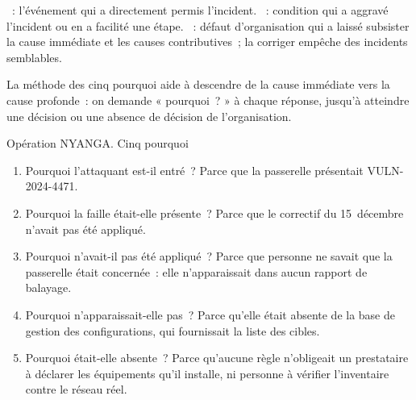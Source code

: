 \begin{boxdef}
\textbf{}~: l'événement qui a directement permis
l'incident. \textbf{}~: condition qui a
aggravé l'incident ou en a facilité une étape. \textbf{}~: défaut d'organisation qui a laissé subsister la cause
immédiate et les causes contributives~; la corriger empêche des incidents
semblables.
\end{boxdef}

La méthode des cinq pourquoi aide à descendre de la cause immédiate vers la
cause profonde~: on demande « pourquoi~? » à chaque réponse, jusqu'à
atteindre une décision ou une absence de décision de l'organisation.

\begin{boxscenario}{Opération NYANGA. Cinq pourquoi}
\begin{enumerate}
    \item Pourquoi l'attaquant est-il entré~? Parce que la passerelle
          présentait VULN-2024-4471.
    \item Pourquoi la faille était-elle présente~? Parce que le correctif du
          15~décembre n'avait pas été appliqué.
    \item Pourquoi n'avait-il pas été appliqué~? Parce que personne ne savait
          que la passerelle était concernée~: elle n'apparaissait dans aucun
          rapport de balayage.
    \item Pourquoi n'apparaissait-elle pas~? Parce qu'elle était absente de
          la base de gestion des configurations, qui fournissait la liste des
          cibles.
    \item Pourquoi était-elle absente~? Parce qu'aucune règle n'obligeait un
          prestataire à déclarer les équipements qu'il installe, ni personne
          à vérifier l'inventaire contre le réseau réel.
\end{enumerate}
\end{boxscenario}

